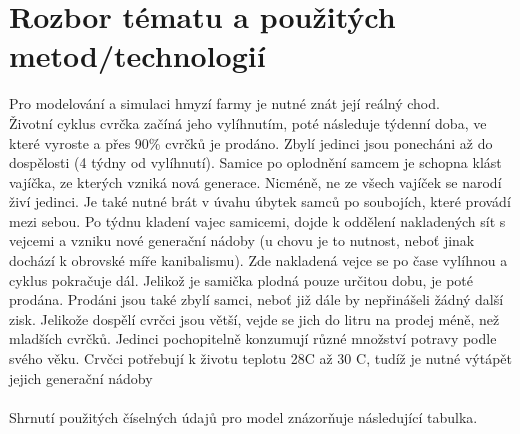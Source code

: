 \documentclass[11pt, a4paper, titlepage]{article}
\begin{document}
    \section{Rozbor tématu a použitých metod/technologií}
    Pro modelování a simulaci hmyzí farmy je nutné znát její reálný chod. \\
    Životní cyklus cvrčka začíná jeho vylíhnutím, poté následuje týdenní doba, ve které vyroste a přes 90\% cvrčků je prodáno.
    Zbylí jedinci jsou ponecháni až do dospělosti (4 týdny od vylíhnutí). Samice po oplodnění samcem je schopna klást vajíčka, ze kterých vzniká
    nová generace. Nicméně, ne ze všech vajíček se narodí živí jedinci. Je také nutné brát v úvahu úbytek samců po soubojích, které provádí mezi sebou.
    Po týdnu kladení vajec samicemi, dojde k oddělení nakladených sít s vejcemi a vzniku nové generační nádoby (u chovu je to nutnost, neboť jinak dochází
    k obrovské míře kanibalismu). Zde nakladená vejce se po čase vylíhnou a cyklus pokračuje dál. Jelikož je samička plodná pouze určitou dobu,
    je poté prodána. Prodáni jsou také zbylí samci, neboť již dále by nepřinášeli žádný další zisk. Jelikože dospělí cvrčci jsou větší,
    vejde se jich do litru na prodej méně, než mladších cvrčků. Jedinci pochopitelně konzumují různé množství potravy podle svého věku. Crvčci potřebují k
    životu teplotu 28\degree C až 30 \degree C, tudíž je nutné výtápět jejich generační nádoby\\
    \\
    Shrnutí použitých číselných údajů pro model znázorňuje následující tabulka.
\end{document}
